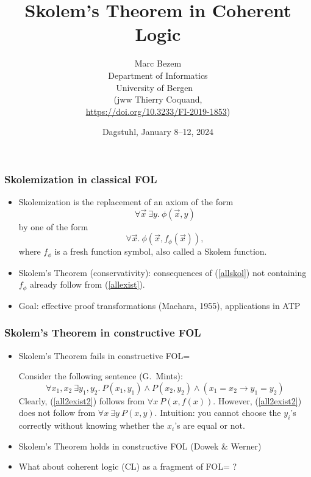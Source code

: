\documentclass[handout,11pt,hyperref ={colorlinks = true, urlcolor = red}]{beamer}
\title{Skolem's Theorem in Coherent Logic}
\author{Marc Bezem\\
Department of Informatics\\
University of Bergen
\mbox{ }\\
(jww Thierry Coquand,\\
\url{https://doi.org/10.3233/FI-2019-1853})
}
\date{Dagstuhl, January 8--12, 2024}
\begin{document}
\frame{\titlepage}


\begin{frame}
\frametitle{Skolemization in classical FOL}
\begin{itemize}[<+->]   %
    \item
Skolemization is the replacement of an axiom of the form
\begin{equation}\label{allexist}
\forall\vec{x}~\exists y.~\phi(\vec{x},y)
\end{equation}
by one of the form
\begin{equation}\label{allskol}
\forall\vec{x}.~\phi(\vec{x},f_\phi(\vec{x})),
\end{equation}
where $f_\phi$ is a fresh function symbol, also called a Skolem function.

\item
Skolem's Theorem (conservativity): consequences of (\ref{allskol}) not 
containing $f_\phi$ already follow from (\ref{allexist}).
\item
Goal: effective proof transformations (Maehara, 1955),
applications in ATP
\end{itemize} 
\end{frame}

\begin{frame}
\frametitle{Skolem's Theorem in constructive FOL}

\begin{itemize}[<+->]   %
    \item
Skolem's Theorem fails in constructive FOL=

Consider the following sentence (G.\ Mints):
\begin{equation}\label{all2exist2}
\forall x_1,x_2~\exists y_1,y_2. ~P(x_1,y_1) \land P(x_2,y_2) \land (x_1 = x_2 \to y_1 = y_2)
\end{equation}
Clearly, (\ref{all2exist2}) follows from $\forall{x}~P({x},f(x))$.
However, (\ref{all2exist2}) does not follow from 
$\forall{x}~\exists y~P({x},y)$. Intuition: you cannot choose the $y_i$'s
correctly without knowing whether the $x_i$'s are equal or not.
\item
Skolem's Theorem holds in constructive FOL (Dowek \& Werner)
\item What about coherent logic (CL) as a fragment of FOL= ?
\end{itemize}
\end{frame}
\end{document}
